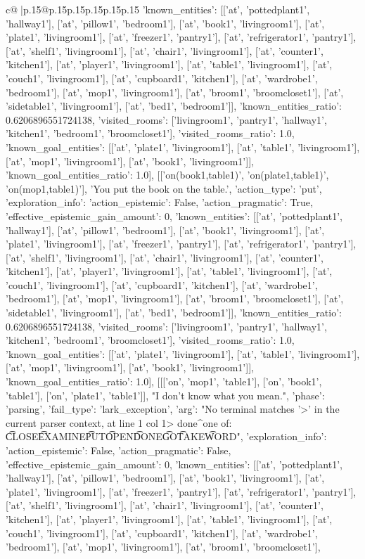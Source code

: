 \documentclass{article}
\begin{document}
{\begin{supertabular}{c@{$\;$}|p{.15\linewidth}@{}p{.15\linewidth}p{.15\linewidth}p{.15\linewidth}p{.15\linewidth}p{.15\linewidth}}
{{{'known_entities': [['at', 'pottedplant1', 'hallway1'], ['at', 'pillow1', 'bedroom1'], ['at', 'book1', 'livingroom1'], ['at', 'plate1', 'livingroom1'], ['at', 'freezer1', 'pantry1'], ['at', 'refrigerator1', 'pantry1'], ['at', 'shelf1', 'livingroom1'], ['at', 'chair1', 'livingroom1'], ['at', 'counter1', 'kitchen1'], ['at', 'player1', 'livingroom1'], ['at', 'table1', 'livingroom1'], ['at', 'couch1', 'livingroom1'], ['at', 'cupboard1', 'kitchen1'], ['at', 'wardrobe1', 'bedroom1'], ['at', 'mop1', 'livingroom1'], ['at', 'broom1', 'broomcloset1'], ['at', 'sidetable1', 'livingroom1'], ['at', 'bed1', 'bedroom1']], 'known_entities_ratio': 0.6206896551724138, 'visited_rooms': ['livingroom1', 'pantry1', 'hallway1', 'kitchen1', 'bedroom1', 'broomcloset1'], 'visited_rooms_ratio': 1.0, 'known_goal_entities': [['at', 'plate1', 'livingroom1'], ['at', 'table1', 'livingroom1'], ['at', 'mop1', 'livingroom1'], ['at', 'book1', 'livingroom1']], 'known_goal_entities_ratio': 1.0}}], [['on(book1,table1)', 'on(plate1,table1)', 'on(mop1,table1)'], 'You put the book on the table.', {'action_type': 'put', 'exploration_info': {'action_epistemic': False, 'action_pragmatic': True, 'effective_epistemic_gain_amount': 0, 'known_entities': [['at', 'pottedplant1', 'hallway1'], ['at', 'pillow1', 'bedroom1'], ['at', 'book1', 'livingroom1'], ['at', 'plate1', 'livingroom1'], ['at', 'freezer1', 'pantry1'], ['at', 'refrigerator1', 'pantry1'], ['at', 'shelf1', 'livingroom1'], ['at', 'chair1', 'livingroom1'], ['at', 'counter1', 'kitchen1'], ['at', 'player1', 'livingroom1'], ['at', 'table1', 'livingroom1'], ['at', 'couch1', 'livingroom1'], ['at', 'cupboard1', 'kitchen1'], ['at', 'wardrobe1', 'bedroom1'], ['at', 'mop1', 'livingroom1'], ['at', 'broom1', 'broomcloset1'], ['at', 'sidetable1', 'livingroom1'], ['at', 'bed1', 'bedroom1']], 'known_entities_ratio': 0.6206896551724138, 'visited_rooms': ['livingroom1', 'pantry1', 'hallway1', 'kitchen1', 'bedroom1', 'broomcloset1'], 'visited_rooms_ratio': 1.0, 'known_goal_entities': [['at', 'plate1', 'livingroom1'], ['at', 'table1', 'livingroom1'], ['at', 'mop1', 'livingroom1'], ['at', 'book1', 'livingroom1']], 'known_goal_entities_ratio': 1.0}}], [[['on', 'mop1', 'table1'], ['on', 'book1', 'table1'], ['on', 'plate1', 'table1']], "I don't know what you mean.", {'phase': 'parsing', 'fail_type': 'lark_exception', 'arg': "No terminal matches '>' in the current parser context, at line 1 col 1\n\n> done\n^\nExpected one of: \n\t* CLOSE\n\t* EXAMINE\n\t* PUT\n\t* OPEN\n\t* DONE\n\t* GO\n\t* TAKE\n\t* WORD\n", 'exploration_info': {'action_epistemic': False, 'action_pragmatic': False, 'effective_epistemic_gain_amount': 0, 'known_entities': [['at', 'pottedplant1', 'hallway1'], ['at', 'pillow1', 'bedroom1'], ['at', 'book1', 'livingroom1'], ['at', 'plate1', 'livingroom1'], ['at', 'freezer1', 'pantry1'], ['at', 'refrigerator1', 'pantry1'], ['at', 'shelf1', 'livingroom1'], ['at', 'chair1', 'livingroom1'], ['at', 'counter1', 'kitchen1'], ['at', 'player1', 'livingroom1'], ['at', 'table1', 'livingroom1'], ['at', 'couch1', 'livingroom1'], ['at', 'cupboard1', 'kitchen1'], ['at', 'wardrobe1', 'bedroom1'], ['at', 'mop1', 'livingroom1'], ['at', 'broom1', 'broomcloset1'], }}}
\end{supertabular}}
\end{document}
